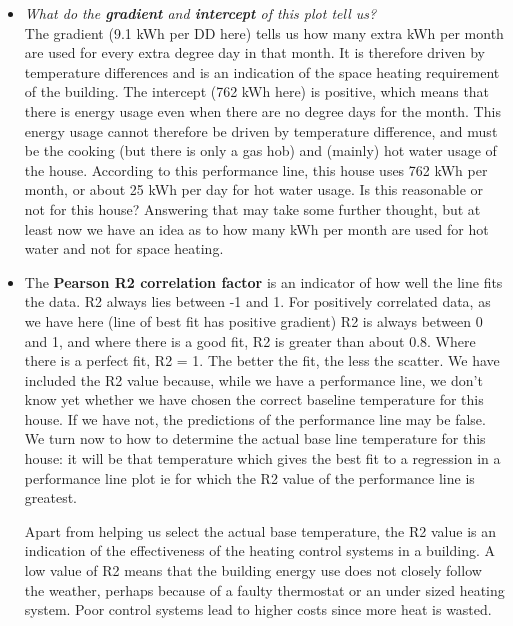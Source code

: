 \documentclass{article}
\begin{document}
\begin{enumerate}
{\begin{itemize}
\item \textit{What do the \textbf{gradient} and \textbf{intercept} of this plot tell us?} \\The gradient (9.1 kWh per DD here) tells us how many extra kWh per month are used for every extra degree day in that month. It is therefore driven by temperature differences and is an indication of the space heating requirement of the building. The intercept (762 kWh here) is positive, which means that there is energy usage even when there are no degree days for the month. This energy usage cannot therefore be driven by temperature difference, and must be the cooking (but there is only a gas hob) and (mainly) hot water usage of the house. According to this performance line, this house uses 762 kWh per month, or about 25 kWh per day for hot water usage. Is this reasonable or not for this house? Answering that may take some further thought, but at least now we have an idea as to how many kWh per month are used for hot water and not for space heating.

\item The \textbf{Pearson R2 correlation factor} is an indicator of how well the line fits the data. R2 always lies between -1 and 1. For positively correlated data, as we have here (line of best fit has positive gradient) R2 is always between 0 and 1, and where there is a good fit, R2 is greater than about 0.8. Where there is a perfect fit, R2 = 1. The better the fit, the less the scatter. We have included the R2 value because, while we have a performance line, we don't know yet whether we have chosen the correct baseline temperature for this house. If we have not, the predictions of the performance line may be false.\\ We turn now to how to determine the actual base line temperature for this house: it will be that temperature which gives the best fit to a regression in a performance line plot ie for which the R2 value of the performance line is greatest.

Apart from helping us select the actual base temperature, the  R2  value is an indication of the effectiveness of the heating control systems in a building. A low value of  R2  means that the building energy use does not closely follow the weather, perhaps because of a faulty thermostat or an under sized heating system. Poor control systems lead to higher costs since more heat is wasted.
\end{itemize}
}
\end{enumerate}
\end{document}
